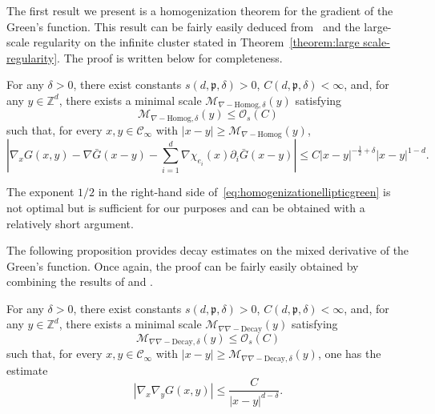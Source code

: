 \documentclass[12pt]{amsart}
\numberwithin{equation}{section}
\begin{document}
	The first result we present is a homogenization theorem for the gradient of the Green's function. This result can be fairly easily deduced from~\cite[Theorem 2]{dario-gu-green} and the large-scale regularity on the infinite cluster stated in Theorem~\ref{theorem:large scale-regularity}. The proof is written below for completeness. 
	
	\begin{prop} \label{prop:homogenizationellipticgreen}
		For any $\delta > 0$, there exist constants $s(d , \mathfrak{p}, \delta)> 0$, $C (d , \mathfrak{p}, \delta) < \infty$, and, for any $y \in \mathbb{Z}^d$, there exists a minimal scale $\mathcal{M}_{\nabla-\mathrm{Homog}, \delta}(y)$
		satisfying 
		\begin{equation*}
			\mathcal{M}_{\nabla-\mathrm{Homog}, \delta}(y) \leq \mathcal{O}_s(C)
		\end{equation*}
		such that, for every $x, y \in \mathscr{C}_\infty$ with $|x - y| \geq \mathcal{M}_{\nabla-\mathrm{Homog}}(y)$,
		\begin{equation} \label{eq:homogenizationellipticgreen}
			\left| \nabla_x G(x , y) - \nabla \bar G(x - y) - \sum_{i = 1}^d \nabla \chi_{e_i}(x) \partial_i \bar G(x - y) \right| \leq C |x-y|^{-\frac{1}{2}+\delta} |x - y|^{1-d}.
		\end{equation}	
	\end{prop}
	
	\begin{remark}
		The exponent $1/2$ in the right-hand side of~\eqref{eq:homogenizationellipticgreen} is not optimal but is sufficient for our purposes and can be obtained with a relatively short argument.
	\end{remark}
	
	
	The following proposition provides decay estimates on the mixed derivative of the Green's function. Once again, the proof can be fairly easily obtained by combining the results of \cite{dario-gu-green}
	and \cite{armstrong-dario-2018}.
	
	
	\begin{prop} \label{prop:green-mixed-derivative}
		For any $\delta > 0$, there exist constants $s(d , \mathfrak{p}, \delta)> 0$, $C (d , \mathfrak{p}, \delta) < \infty$, and, for any $y \in \mathbb{Z}^d$, there exists a minimal scale $\mathcal{M}_{\nabla\nabla-\mathrm{Decay}}(y)$
		satisfying 
		\begin{equation} \label{eq:stoch.estMdecay}
			\mathcal{M}_{\nabla\nabla-\mathrm{Decay}, \delta}(y) \leq \mathcal{O}_s(C)
		\end{equation}
		such that, for every $x, y \in \mathscr{C}_\infty$ with $|x - y| \geq \mathcal{M}_{\nabla\nabla-\mathrm{Decay}, \delta}(y)$, one has the estimate
		\begin{equation*}
			|\nabla_x \nabla_y G(x, y)| \leq \frac{C}{|x - y|^{d - \delta}}.
		\end{equation*}
	\end{prop}
	
\end{document}
